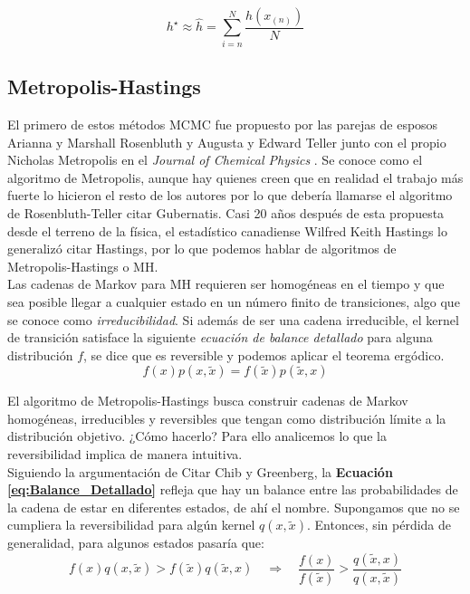 \begin{equation*}
h^\star \approx \hat{h} = \sum\limits_{i=n}^N \dfrac{h(x_{(n)})}{N}
\end{equation*}

\subsection{Metropolis-Hastings}

 El primero de estos métodos MCMC fue propuesto por las parejas de esposos Arianna y Marshall Rosenbluth y Augusta y Edward Teller junto con el propio Nicholas Metropolis en el \textit{Journal of Chemical Physics} \parencite{Metropolis53}. Se conoce como el algoritmo de Metropolis, aunque hay quienes creen que en realidad el trabajo más fuerte lo hicieron el resto de los autores por lo que debería llamarse el algoritmo de Rosenbluth-Teller {\color{Red} citar Gubernatis}. Casi 20 años después de esta propuesta desde el terreno de la física, el estadístico canadiense Wilfred Keith Hastings lo generalizó {\color{Red} citar Hastings}, por lo que podemos hablar de algoritmos de Metropolis-Hastings o MH.\\
 
Las cadenas de Markov para MH requieren ser homogéneas en el tiempo y que sea posible llegar a cualquier estado en un número finito de transiciones, algo que se conoce como \textit{irreducibilidad}. Si además de ser una cadena irreducible, el kernel de transición satisface la siguiente \textit{ecuación de balance detallado} para alguna distribución $f$, se dice que es reversible y podemos aplicar el teorema ergódico.
\begin{equation}
\label{eq:Balance_Detallado}
f(x)p(x,\tilde{x})=f(\tilde{x})p(\tilde{x},x)
\end{equation}

El algoritmo de Metropolis-Hastings busca construir cadenas de Markov homogéneas, irreducibles y reversibles que tengan como distribución límite a la distribución objetivo. ¿Cómo hacerlo? Para ello analicemos lo que la reversibilidad implica de manera intuitiva.\\

Siguiendo la argumentación de {\color{Red} Citar Chib y Greenberg}, la \textbf{Ecuación \ref{eq:Balance_Detallado}} refleja que hay un balance entre las probabilidades de la cadena de estar en diferentes estados, de ahí el nombre. Supongamos que no se cumpliera la reversibilidad para algún kernel $q(x,\tilde{x})$. Entonces, sin pérdida de generalidad, para algunos estados pasaría que:
\begin{equation}
\label{eq:Inbalance_Detallado}
f(x)q(x,\tilde{x})>f(\tilde{x})q(\tilde{x},x) \quad \Rightarrow \quad \dfrac{f(x)}{f(\tilde{x})}>\dfrac{q(\tilde{x},x)}{q(x,\tilde{x})}
\end{equation}


